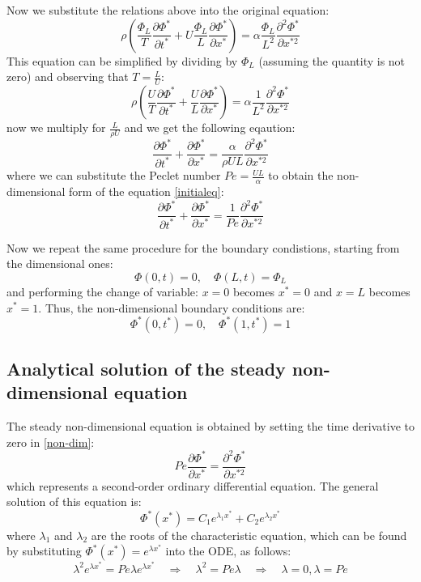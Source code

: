 \documentclass{article}
\begin{document}
Now we substitute the relations above into the original equation:
\[
    \rho \left(\frac{\Phi_L}{T} \frac{\partial \Phi^*}{\partial t^*} + U \frac{\Phi_L}{L} \frac{\partial \Phi^*}{\partial x^*}\right) = \alpha \frac{\Phi_L}{L^2} \frac{\partial^2 \Phi^*}{\partial x^{*2}}
\]
This equation can be simplified by dividing by $\Phi_L$ (assuming the quantity is not zero) and observing that $T = \tfrac{L}{U}$:
\[
    \rho \left(\frac{U}{T} \frac{\partial \Phi^*}{\partial t^*} + \frac{U}{L} \frac{\partial \Phi^*}{\partial x^*}\right) = \alpha \frac{1}{L^2} \frac{\partial^2 \Phi^*}{\partial x^{*2}}
\]
now we multiply for $\frac{L}{\rho U}$ and we get the following eqaution:
\[
    \frac{\partial \Phi^*}{\partial t^*} +  \frac{\partial \Phi^*}{\partial x^*} = \frac{\alpha}{\rho U L} \frac{\partial^2 \Phi^*}{\partial x^{*2}}
\]
where we can substitute the Peclet number $Pe = \tfrac{U L}{\alpha}$ to obtain the non-dimensional form of the equation \eqref{initialeq}:
\begin{equation} \label{non-dim}
    \frac{\partial \Phi^*}{\partial t^*} +\frac{\partial \Phi^*}{\partial x^*} = \frac{1}{Pe} \frac{\partial^2 \Phi^*}{\partial x^{*2}} 
\end{equation}

Now we repeat the same procedure for the boundary condistions, starting from the dimensional ones:
\begin{equation} \label{bc}
    \Phi(0, t) = 0, \quad \Phi(L, t) = \Phi_L
\end{equation}
and performing the change of variable: $x = 0$ becomes $x^* = 0$ and $x = L$ becomes $x^* = 1$.
Thus, the non-dimensional boundary conditions are:
\begin{equation} \label{non-dim-bc}
    \Phi^*(0, t^*) = 0, \quad \Phi^*(1, t^*) = 1
\end{equation}

\subsection{Analytical solution of the steady non-dimensional equation}
The steady non-dimensional equation is obtained by setting the time derivative to zero in \eqref{non-dim}:
\begin{equation} \label{steady}
    Pe \frac{\partial \Phi^*}{\partial x^*} = \frac{\partial^2 \Phi^*}{\partial x^{*2}}
\end{equation}
which represents a second-order ordinary differential equation. The general solution of this equation is:
\[
    \Phi^*(x^*) = C_1 e^{\lambda_1 x^*} + C_2 e^{\lambda_2 x^*}
\]
where $\lambda_1$ and $\lambda_2$ are the roots of the characteristic equation, which can be found by substituting $\Phi^*(x^*) = e^{\lambda x^*}$ into the ODE, as follows:
\[
    \lambda^2 e^{\lambda x^*} = Pe \lambda e^{\lambda x^*} \quad \Rightarrow \quad \lambda^2 = Pe \lambda \quad \Rightarrow \quad \lambda = 0, \lambda = Pe
\]
\end{document}
